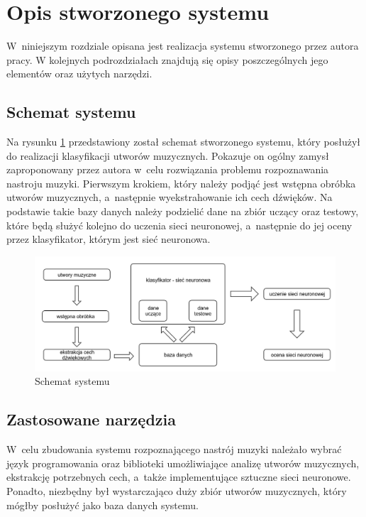 \section{Opis stworzonego systemu}\label{rozdzial_system}
W~niniejszym rozdziale opisana jest realizacja systemu stworzonego przez autora pracy. W kolejnych podrozdziałach znajdują się opisy poszczególnych jego elementów oraz użytych narzędzi.

\subsection{Schemat systemu}
Na rysunku \ref{systemSchemeImage} przedstawiony został schemat stworzonego systemu, który posłużył do realizacji klasyfikacji utworów muzycznych. Pokazuje on ogólny zamysł zaproponowany przez autora w~celu rozwiązania problemu rozpoznawania nastroju muzyki. Pierwszym krokiem, który należy podjąć jest wstępna obróbka utworów muzycznych, a~następnie wyekstrahowanie ich cech dźwięków. Na podstawie takie bazy danych należy podzielić dane na zbiór uczący oraz testowy, które będą służyć kolejno do uczenia sieci neuronowej, a~następnie do jej oceny przez klasyfikator, którym jest sieć neuronowa.

\begin{figure}[ht!]
\centering
\includegraphics[scale=0.4]{res/systemScheme.png}
\caption{Schemat systemu}\label{systemSchemeImage}
\end{figure}

\subsection{Zastosowane narzędzia}
W~celu zbudowania systemu rozpoznającego nastrój muzyki należało wybrać język programowania oraz biblioteki umożliwiające analizę utworów muzycznych, ekstrakcję potrzebnych cech, a~także implementujące sztuczne sieci neuronowe. Ponadto, niezbędny był wystarczająco duży zbiór utworów muzycznych, który mógłby posłużyć jako baza danych systemu.

